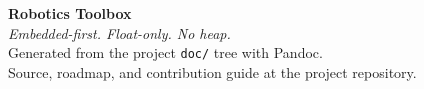 \cleardoublepage
\thispagestyle{empty}
\vspace*{\fill}
\begin{center}
{\Large\bfseries\color{RoyalBlue} Robotics Toolbox}\\[0.5em]
{\itshape Embedded-first. Float-only. No heap.}\\[2em]
Generated from the project \texttt{doc/} tree with Pandoc.\\
Source, roadmap, and contribution guide at the project repository.
\end{center}
\vspace*{\fill}
